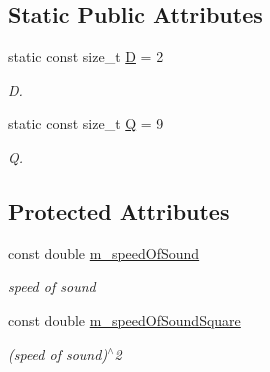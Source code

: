 \subsection*{Static Public Attributes}
\begin{DoxyCompactItemize}
\item 
\hypertarget{classnatrium_1_1D2Q9Model_a81532a1067ba5f280698a1a84711ede5}{static const size\-\_\-t \hyperlink{classnatrium_1_1D2Q9Model_a81532a1067ba5f280698a1a84711ede5}{D} = 2}\label{classnatrium_1_1D2Q9Model_a81532a1067ba5f280698a1a84711ede5}

\begin{DoxyCompactList}\small\item\em D. \end{DoxyCompactList}\item 
\hypertarget{classnatrium_1_1D2Q9Model_ad3d102dfb9c8ad7b56a8f82c3f4286f6}{static const size\-\_\-t \hyperlink{classnatrium_1_1D2Q9Model_ad3d102dfb9c8ad7b56a8f82c3f4286f6}{Q} = 9}\label{classnatrium_1_1D2Q9Model_ad3d102dfb9c8ad7b56a8f82c3f4286f6}

\begin{DoxyCompactList}\small\item\em Q. \end{DoxyCompactList}\end{DoxyCompactItemize}
\subsection*{Protected Attributes}
\begin{DoxyCompactItemize}
\item 
\hypertarget{classnatrium_1_1D2Q9Model_ab212c0c04921591f16c1970d93878cf9}{const double \hyperlink{classnatrium_1_1D2Q9Model_ab212c0c04921591f16c1970d93878cf9}{m\-\_\-speed\-Of\-Sound}}\label{classnatrium_1_1D2Q9Model_ab212c0c04921591f16c1970d93878cf9}

\begin{DoxyCompactList}\small\item\em speed of sound \end{DoxyCompactList}\item 
\hypertarget{classnatrium_1_1D2Q9Model_afa28316438de5055d51674d89a0075ba}{const double \hyperlink{classnatrium_1_1D2Q9Model_afa28316438de5055d51674d89a0075ba}{m\-\_\-speed\-Of\-Sound\-Square}}\label{classnatrium_1_1D2Q9Model_afa28316438de5055d51674d89a0075ba}

\begin{DoxyCompactList}\small\item\em (speed of sound)$^\wedge$2 \end{DoxyCompactList}\end{DoxyCompactItemize}


